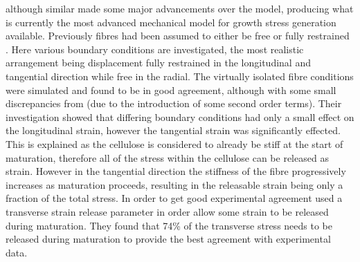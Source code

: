 \citet{Alm_ras_2005}
although similar made some major advancements over the \citet{Yamamoto_1998} model,
producing what is currently the most advanced mechanical model for growth
stress generation available. Previously fibres had been assumed to either be
free \citep{Yamamoto_1998} or fully restrained \citep{archer1987,archer1989}. Here
various boundary conditions are investigated, the most realistic arrangement being
displacement fully restrained in the longitudinal and tangential direction while
free in the radial. The virtually isolated fibre conditions were simulated
and found to be in good agreement, although with some small discrepancies from
\citet{Yamamoto_1998} (due to the introduction of some second order terms).  Their
investigation showed that differing boundary conditions had only a small effect
on the longitudinal strain, however the tangential strain was significantly
effected. This is explained as the cellulose is considered to already be stiff at
the start of maturation, therefore all of the stress within the cellulose can be
released as strain. However in the tangential direction the stiffness of the
fibre progressively increases as maturation proceeds, resulting in the
releasable strain being only a fraction of the total stress. In order to get good
experimental agreement \citet{Alm_ras_2005} used a transverse strain release
parameter in order allow some strain to be released during maturation. They
found that 74\% of the transverse stress needs to be released during maturation
to provide the best agreement with experimental data.